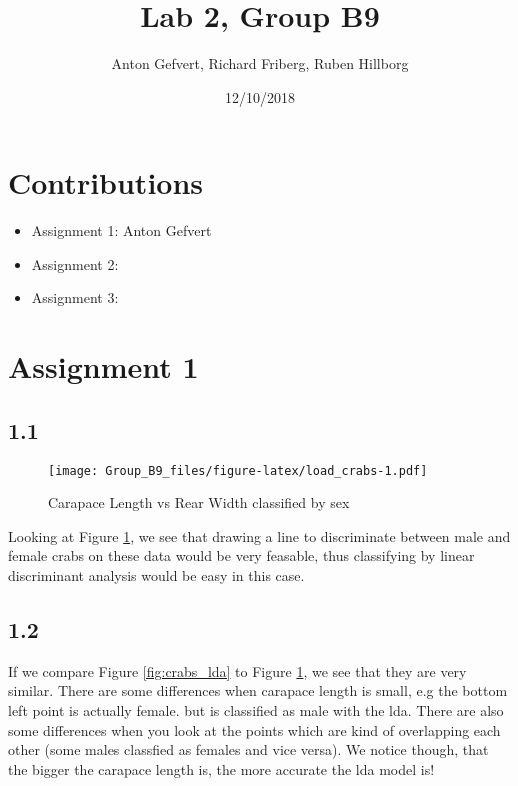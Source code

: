 \documentclass[]{article}
\title{Lab 2, Group B9}
\author{Anton Gefvert, Richard Friberg, Ruben Hillborg}
\date{12/10/2018}
\providecommand{\tightlist}{%
  \setlength{\itemsep}{0pt}\setlength{\parskip}{0pt}}
\begin{document}
\maketitle

\section{Contributions}\label{contributions}

\begin{itemize}
\tightlist
\item
  Assignment 1: Anton Gefvert
\item
  Assignment 2:
\item
  Assignment 3:
\end{itemize}

\section{Assignment 1}\label{assignment-1}

\subsection{1.1}\label{section}

\begin{figure}
\centering
\texttt{[image: Group\_B9\_files/figure-latex/load\_crabs-1.pdf]}
\caption{\label{fig:crabs} Carapace Length vs Rear Width classified by
sex}
\end{figure}

Looking at Figure \ref{fig:crabs}, we see that drawing a line to
discriminate between male and female crabs on these data would be very
feasable, thus classifying by linear discriminant analysis would be easy
in this case.

\subsection{1.2}\label{section-1}

If we compare Figure \ref{fig:crabs_lda} to Figure \ref{fig:crabs}, we
see that they are very similar. There are some differences when carapace
length is small, e.g the bottom left point is actually female. but is
classified as male with the lda. There are also some differences when
you look at the points which are kind of overlapping each other (some
males classfied as females and vice versa). We notice though, that the
bigger the carapace length is, the more accurate the lda model is!
\end{document}
